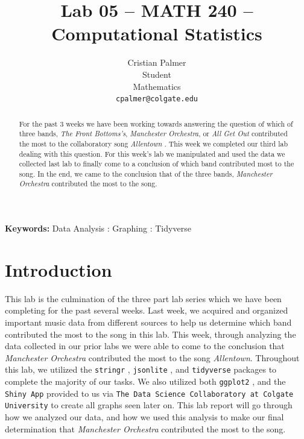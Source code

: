 \documentclass{article}\usepackage[]{graphicx}\usepackage[]{xcolor}
\begin{document}
\vspace{-1in}
\title{Lab 05 -- MATH 240 -- Computational Statistics}

\author{
  Cristian Palmer \\
  Student  \\
  Mathematics  \\
  {\tt cpalmer@colgate.edu}
}

\date{}

\maketitle

\begin{multicols}{2}
\begin{abstract}
For the past 3 weeks we have been working towards answering the question of which of three bands, \textit{The Front Bottoms's}, \textit{Manchester Orchestra}, or \textit{All Get Out} contributed the most to the collaboratory song \textit{Allentown} \citep{Song}. This week we completed our third lab dealing with this question. For this week's lab we manipulated and used the data we collected last lab to finally come to a conclusion of which band contributed most to the song. In the end, we came to the conclusion that of the three bands, \textit{Manchester Orchestra} contributed the most to the song.
\end{abstract}

\noindent \textbf{Keywords:} Data Analysis : Graphing : Tidyverse
\section{Introduction}
This lab is the culmination of the three part lab series which we have been completing for the past several weeks. Last week, we acquired and organized important music data from different sources to help us determine which band contributed the most to the song in this lab. This week, through analyzing the data collected in our prior labs we were able to come to the conclusion that \textit{Manchester Orchestra} contributed the most to the song \textit{Allentown}. Throughout this lab, we utilized the \texttt{stringr} \citep{stringr}, \texttt{jsonlite} \citep{jsonlite}, and \texttt{tidyverse} \citep{tidyverse} packages to complete the majority of our tasks. We also utilized both \texttt{ggplot2} \citep{ggplot2}, and the \texttt{Shiny App} provided to us via \texttt{The Data Science Collaboratory at Colgate University} \citep{Shiny} to create all graphs seen later on. This lab report will go through how we analyzed our data, and how we used this analysis to make our final determination that \textit{Manchester Orchestra} contributed the most to the song.


\end{multicols}
\end{document}
